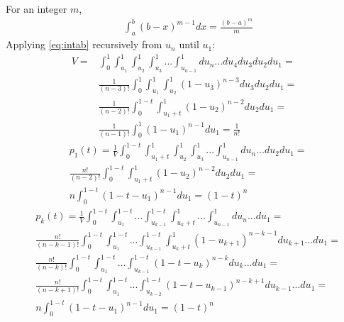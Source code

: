 \documentclass{llncs}
\begin{document}
For an integer $m$,
\begin{eqnarray}
&\displaystyle \int_a^b\left(b-x\right)^{m-1}dx=
\displaystyle \frac{\left(b-a\right)^m}{m}  \label{eq:intab}
\end{eqnarray} 
Applying \ref{eq:intab} recursively from $u_n$ until $u_1$: 
\begin{eqnarray}
V = &\displaystyle \int_0^1\int_{u_1}^1\int_{u_2}^1\int_{u_3}^1...\int_{u_{n-1}}^1 du_n...du_4 du_3 du_2 du_1 = \nonumber \\ 
&\displaystyle \frac{1}{(n-3)!}\int_0^1\int_{u_1}^1\int_{u_2}^1 \left( 1-u_3 \right)^{n-3}du_3 du_2 du_1 = \nonumber \\
&\displaystyle \frac{1}{(n-2)!}\int_0^{1-t}\int_{{u_1}+t}^1\left( 1-u_2 \right)^{n-2} du_2 du_1 = \nonumber \\
&\displaystyle \frac{1}{(n-1)!} \int_0^1\left( 1-u_1 \right)^{n-1} du_1 = \frac{1}{n!} \label{eq:volume}
\end{eqnarray} 
\begin{eqnarray}
& p_1(t) =  \displaystyle \frac{1}{V}\displaystyle \int_0^{1-t}\int_{{u_1}+t}^1\int_{u_2}^1\int_{u_3}^1...\int_{u_{n-1}}^1 du_n...du_2 du_1 =  \nonumber \\ 
&\displaystyle \frac{n!}{(n-2)!}\int_0^{1-t}\int_{{u_1}+t}^1\left( 1-u_2 \right)^{n-2} du_2 du_1 =  \nonumber \\
&\displaystyle n \int_0^{1-t}\left( 1-t-u_1 \right)^{n-1} du_1 = (1-t)^n \label{eq:p_1}
\end{eqnarray}
\begin{eqnarray}
& p_k(t) = \displaystyle \frac{1}{V}\displaystyle \int_0^{1-t}\int_{{u_1}}^{1-t}...\int_{u_{k-1}}^{1-t}\int_{u_k+t}^1...\int_{u_{n-1}}^1 du_n... du_1 =  \nonumber \\ 
& \displaystyle \frac{n!}{(n-k-1)!}\displaystyle \int_0^{1-t}\int_{{u_1}}^{1-t}...\int_{u_{k-1}}^{1-t}\int_{u_k+t}^1 \left( 1-u_{k+1} \right)^{n-k-1} du_{k+1}...du_1 =  \nonumber \\
& \displaystyle \frac{n!}{(n-k)!}\displaystyle \int_0^{1-t}\int_{{u_1}}^{1-t}...\int_{u_{k-1}}^{1-t} \left( 1-t-u_{k} \right)^{n-k} du_k...du_1 =  \nonumber \\
& \displaystyle \frac{n!}{(n-k+1)!}\displaystyle \int_0^{1-t}\int_{{u_1}}^{1-t}...\int_{u_{k-2}}^{1-t} \left( 1-t-u_{k-1} \right)^{n-k+1} du_{k-1}...du_1 =  \nonumber \\
& \displaystyle n \int_0^{1-t}\left( 1-t-u_1 \right)^{n-1} du_1 = (1-t)^n \label{eq:p_k}
\end{eqnarray}
\end{document}
